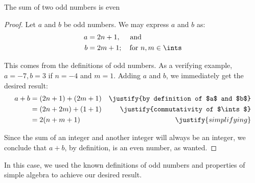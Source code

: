 \documentclass[../proofs.tex]{subfiles}
\begin{document}
\begin{expl}{The sum of two odd numbers is even}
\begin{proof}
Let $a$ and $b$ be odd numbers. We may express $a$ and $b$ as:
\begin{align*}
  a &= 2n + 1, \quad \text{ and}   \\
  b &= 2m + 1; \quad \text{for } n,m \in \ints
\end{align*}

This comes from the definitions of odd numbers. As a verifying example,
$a = -7, b = 3$ if $n = -4$ and $m = 1$. Adding $a$ and $b$, we immediately get
the desired result:
\begin{align*}
  a + b &= (2n + 1) + (2m + 1) 	& \justify{by definition of $a$ and $b$} \\
        &= (2n + 2m) + (1 + 1)  & \justify{commutativity of $\ints$} \\
        &= 2(n+m+1)				& \justify{simplifying}
\end{align*}

Since the sum of an integer and another integer will always be an integer,
we conclude that $a+b$, by definition, is an even number, as wanted.

\end{proof}

\end{expl}

In this case, we used the known definitions of odd numbers and properties of
simple algebra to achieve our desired result.

\end{document}
